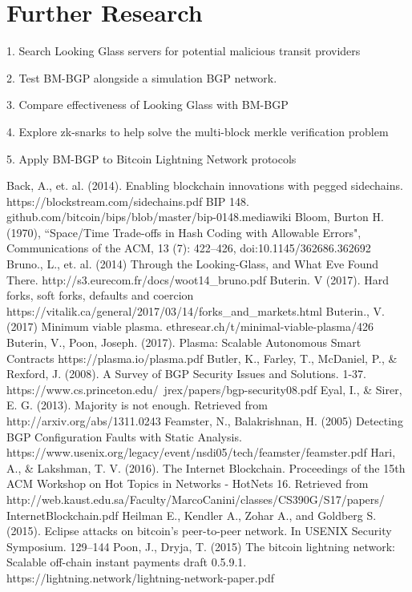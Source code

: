 \documentclass[letterpaper, 10 pt, conference]{ieeeconf}  %
\begin{document}
\section{Further Research}
1. Search Looking Glass servers for potential malicious transit providers

2. Test BM-BGP alongside a simulation BGP network.

3. Compare effectiveness of Looking Glass with BM-BGP

4. Explore zk-snarks to help solve the multi-block merkle verification problem

5. Apply BM-BGP to Bitcoin Lightning Network protocols

\begin{thebibliography}{99}

Back, A., et. al. (2014). Enabling blockchain innovations with pegged sidechains. https://blockstream.com/sidechains.pdf
 BIP 148. github.com/bitcoin/bips/blob/master/bip-0148.mediawiki
 Bloom, Burton H. (1970), ``Space/Time Trade-offs in Hash Coding with Allowable Errors", Communications of the ACM, 13 (7): 422–426, doi:10.1145/362686.362692
 Bruno., L., et. al. (2014) Through the Looking-Glass, and What Eve Found There. http://s3.eurecom.fr/docs/woot14\_bruno.pdf
 Buterin. V (2017). Hard forks, soft forks, defaults and coercion https://vitalik.ca/general/2017/03/14/forks\_and\_markets.html
 Buterin., V. (2017) Minimum viable plasma. ethresear.ch/t/minimal-viable-plasma/426
 Buterin, V., Poon, Joseph. (2017). Plasma: Scalable Autonomous Smart Contracts https://plasma.io/plasma.pdf
 Butler, K., Farley, T., McDaniel, P., \& Rexford, J. (2008). A
Survey of BGP Security Issues and Solutions. 1-37. https://www.cs.princeton.edu/~jrex/papers/bgp-security08.pdf
 Eyal, I., \& Sirer, E. G. (2013). Majority is not enough. Retrieved from http://arxiv.org/abs/1311.0243
Feamster, N., Balakrishnan, H. (2005) Detecting BGP Configuration Faults with Static Analysis. https://www.usenix.org/legacy/event/nsdi05/tech/feamster/feamster.pdf
 Hari, A., \& Lakshman, T. V. (2016). The Internet Blockchain. Proceedings of the 15th ACM Workshop on Hot Topics in Networks - HotNets 16. Retrieved from http://web.kaust.edu.sa/Faculty/MarcoCanini/classes/CS390G/S17/papers/
InternetBlockchain.pdf
 Heilman E., Kendler A., Zohar A., and Goldberg S. (2015). Eclipse attacks on bitcoin’s peer-to-peer network. In USENIX Security Symposium. 129–144
 Poon, J., Dryja, T. (2015) The bitcoin lightning network: Scalable off-chain instant payments draft 0.5.9.1. https://lightning.network/lightning-network-paper.pdf

\end{thebibliography}
\end{document}
